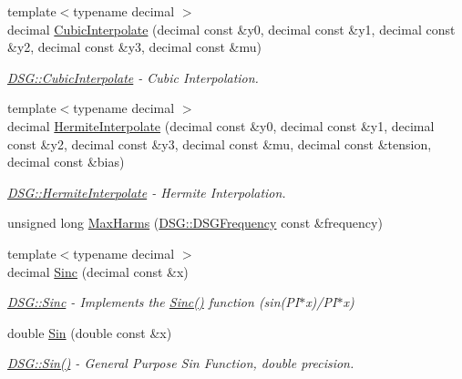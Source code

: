 \begin{DoxyCompactItemize}
{\footnotesize template$<$typename decimal $>$ }\\decimal \hyperlink{namespace_d_s_g_a7c61e97fb15300de270eb32d51cdc849}{Cubic\+Interpolate} (decimal const \&y0, decimal const \&y1, decimal const \&y2, decimal const \&y3, decimal const \&mu)
\begin{DoxyCompactList}\small\item\em \hyperlink{namespace_d_s_g_a7c61e97fb15300de270eb32d51cdc849}{D\+S\+G\+::\+Cubic\+Interpolate} -\/ Cubic Interpolation. \end{DoxyCompactList}\item 
{\footnotesize template$<$typename decimal $>$ }\\decimal \hyperlink{namespace_d_s_g_ae1b0502c523a1a123bdde9aa33ebbb77}{Hermite\+Interpolate} (decimal const \&y0, decimal const \&y1, decimal const \&y2, decimal const \&y3, decimal const \&mu, decimal const \&tension, decimal const \&bias)
\begin{DoxyCompactList}\small\item\em \hyperlink{namespace_d_s_g_ae1b0502c523a1a123bdde9aa33ebbb77}{D\+S\+G\+::\+Hermite\+Interpolate} -\/ Hermite Interpolation. \end{DoxyCompactList}\item 
unsigned long \hyperlink{namespace_d_s_g_ab5c4eea42ea10b69cfc32afb83ff1d0d}{Max\+Harms} (\hyperlink{namespace_d_s_g_a4315a061386fa1014fda09b15d3a6973}{D\+S\+G\+::\+D\+S\+G\+Frequency} const \&frequency)
\item 
{\footnotesize template$<$typename decimal $>$ }\\decimal \hyperlink{namespace_d_s_g_a6a99a1c242cddf18f4387f51ec8606b4}{Sinc} (decimal const \&x)
\begin{DoxyCompactList}\small\item\em \hyperlink{namespace_d_s_g_a6a99a1c242cddf18f4387f51ec8606b4}{D\+S\+G\+::\+Sinc} -\/ Implements the \hyperlink{namespace_d_s_g_a6a99a1c242cddf18f4387f51ec8606b4}{Sinc()} function (sin(\+P\+I$\ast$x)/\+P\+I$\ast$x) \end{DoxyCompactList}\item 
double \hyperlink{namespace_d_s_g_aad63d316081c7d13a551acf346ee2749}{Sin} (double const \&x)
\begin{DoxyCompactList}\small\item\em \hyperlink{namespace_d_s_g_aad63d316081c7d13a551acf346ee2749}{D\+S\+G\+::\+Sin()} -\/ General Purpose Sin Function, double precision. \end{DoxyCompactList}\item 

\end{DoxyCompactItemize}

